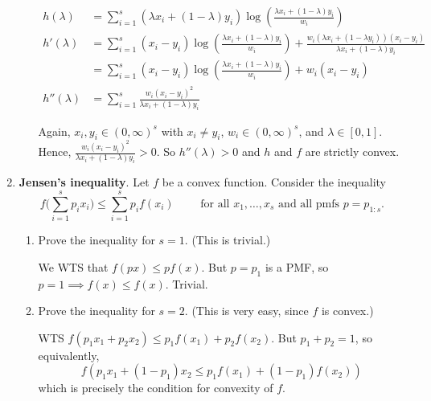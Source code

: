 \documentclass[12pt]{article}
\begin{document}
\begin{enumerate}[1.]
\begin{enumerate}
		            \color{blue}
		            \begin{align*}
			            h(\lambda)   & = \sum_{i=1}^s (\lambda x_i + (1 - \lambda) y_i) \log\left(\frac{\lambda x_i + (1 - \lambda) y_i}{w_i}\right)                                                                     \\
			            h'(\lambda)  & = \sum_{i=1}^{s} (x_i - y_i) \log\left(\frac{\lambda x_i + (1 - \lambda)y_i}{w_i}\right) + \frac{w_i(\lambda x_i + (1 - \lambda y_i))(x_i - y_i)}{\lambda x_i + (1 - \lambda)y_i} \\
			                         & = \sum_{i=1}^{s} (x_i - y_i) \log\left(\frac{\lambda x_i + (1 - \lambda)y_i}{w_i}\right) + w_i(x_i - y_i)                                                                         \\
			            h''(\lambda) & = \sum_{i=1}^{s} \frac{w_i(x_i - y_i)^2}{\lambda x_i + (1 - \lambda)y_i}
		            \end{align*}

		            Again, $x_i, y_i \in (0, \infty)^s$ with $x_i \neq y_i$, $w_i \in (0, \infty)^s$, and $\lambda \in [0, 1]$. Hence, $\frac{w_i(x_i - y_i)^2}{\lambda x_i + (1 - \lambda)y_i} > 0$. So $h''(\lambda) > 0$ and $h$ and $f$ are strictly convex.
		            \color{black}
	      \end{enumerate}


	      \pagebreak
	\item {\bf Jensen's inequality}. Let $f$ be a convex function. Consider the inequality
	      \[ f\bigg(\sum_{i=1}^s p_i x_i\bigg) \leq \sum_{i=1}^s p_i f(x_i)  \quad \quad \text{ for all $x_1,\dotsc,x_s$ and all pmfs $p=p_{1:s}$.} \]
	      \begin{enumerate}
		      \item Prove the inequality for $s=1$. (This is trivial.)

		            \color{blue}
		            We WTS that $f(p x) \leq p f(x)$. But $p = p_1$ is a PMF, so $p = 1 \implies f(x) \leq f(x)$. Trivial.
		            \color{black}

		      \item Prove the inequality for $s=2$. (This is very easy, since $f$ is convex.)

		            \color{blue}
		            WTS $f(p_1x_1 + p_2x_2) \leq p_1f(x_1) + p_2f(x_2)$. But $p_1 + p_2 = 1$, so equivalently,
		            \[f(p_1 x_1 + (1 - p_1)x_2 \leq p_1 f(x_1) + (1 - p_1)f(x_2))\]
		            which is precisely the condition for convexity of $f$.


\end{enumerate}
\end{enumerate}
\end{document}
